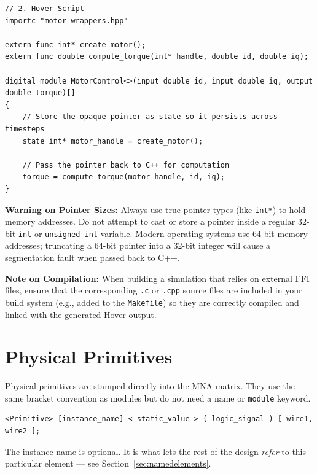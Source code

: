 \documentclass[11pt, a4paper]{article}
\newcommand{\code}[1]{\texttt{\small #1}}
\begin{document}
\begin{lstlisting}
// 2. Hover Script
importc "motor_wrappers.hpp"

extern func int* create_motor();
extern func double compute_torque(int* handle, double id, double iq);

digital module MotorControl<>(input double id, input double iq, output double torque)[] 
{
    // Store the opaque pointer as state so it persists across timesteps
    state int* motor_handle = create_motor();
    
    // Pass the pointer back to C++ for computation
    torque = compute_torque(motor_handle, id, iq);
}
\end{lstlisting}

\textbf{Warning on Pointer Sizes:} Always use true pointer types (like \code{int*}) to hold memory addresses. Do not attempt to cast or store a pointer inside a regular 32-bit \code{int} or \code{unsigned int} variable. Modern operating systems use 64-bit memory addresses; truncating a 64-bit pointer into a 32-bit integer will cause a segmentation fault when passed back to C++.

\textbf{Note on Compilation:} When building a simulation that relies on external FFI files, ensure that the corresponding \code{.c} or \code{.cpp} source files are included in your build system (e.g., added to the \code{Makefile}) so they are correctly compiled and linked with the generated Hover output.

\section{Physical Primitives}

Physical primitives are stamped directly into the MNA matrix. They use the same
bracket convention as modules but do not need a name or \code{module} keyword.

\begin{lstlisting}
<Primitive> [instance_name] < static_value > ( logic_signal ) [ wire1, wire2 ];
\end{lstlisting}

The instance name is optional. It is what lets the rest of the design
\textit{refer} to this particular element --- see
Section~\ref{sec:namedelements}.
\end{document}
